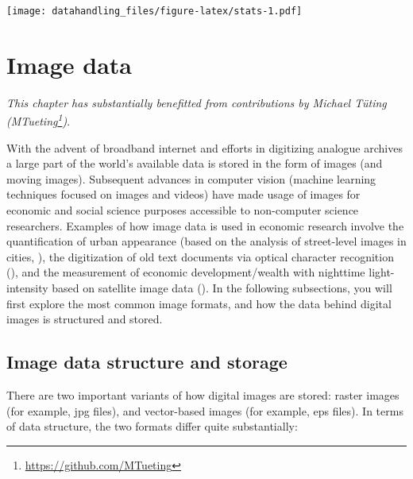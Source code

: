 \documentclass[
  12pt,
]{style/krantz}
\renewcommand{\href}[2]{#2\footnote{\url{#1}}}
\begin{document}
\texttt{[image: datahandling\_files/figure-latex/stats-1.pdf]}

\hypertarget{image-data}{%
\chapter{Image data}\label{image-data}}

\emph{This chapter has substantially benefitted from contributions by Michael Tüting (\href{https://github.com/MTueting}{MTueting})}.

With the advent of broadband internet and efforts in digitizing analogue archives a large part of the world's available data is stored in the form of images (and moving images). Subsequent advances in computer vision (machine learning techniques focused on images and videos) have made usage of images for economic and social science purposes accessible to non-computer science researchers. Examples of how image data is used in economic research involve the quantification of urban appearance (based on the analysis of street-level images in cities, \citet{naik_etal2016}), the digitization of old text documents via optical character recognition (\citet{cesarini_etal2016}), and the measurement of economic development/wealth with nighttime light-intensity based on satellite image data (\citet{hodler_raschky2014}). In the following subsections, you will first explore the most common image formats, and how the data behind digital images is structured and stored.

\hypertarget{image-data-structure-and-storage}{%
\section{Image data structure and storage}\label{image-data-structure-and-storage}}

There are two important variants of how digital images are stored: raster images (for example, jpg files), and vector-based images (for example, eps files). In terms of data structure, the two formats differ quite substantially:
\end{document}
